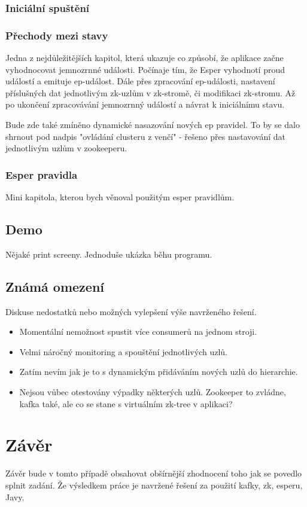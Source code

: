 \documentclass[
  digital, %
  table,   %
  nolof,     %
  nolot,     %
  twoside,
  nocover,
  monochrome,
  12pt
]{fithesis3}
\begin{document}
\subsection{Iniciální spuštění}
\subsection{Přechody mezi stavy}
Jedna z nejdůležitějších kapitol, která ukazuje co způsobí, že aplikace začne vyhodnocovat jemnozrnné události. Počínaje tím, že Esper vyhodnotí proud událostí a emituje ep-událost. Dále přes zpracování ep-události, nastavení příslušných dat jednotlivým zk-uzlům v zk-stromě, či modifikaci zk-stromu. Až po ukončení zpracovávání jemnozrnný událostí a návrat k iniciálnímu stavu.

Bude zde také zmíněno dynamické nasazování nových ep pravidel. To by se dalo shrnout pod nadpis "ovládání clusteru z venčí" - řešeno přes nastavování dat jednotlivým uzlům v zookeeperu.

\subsection{Esper pravidla}
Mini kapitola, kterou bych věnoval použitým esper pravidlům.
\section{Demo}
Nějaké print screeny. Jednoduše ukázka běhu programu.
\section{Známá omezení}
Diskuse nedostatků nebo možných vylepšení výše navrženého řešení. 
\begin{itemize}
	\item Momentální nemožnost spustit více consumerů na jednom stroji.
	\item Velmi náročný monitoring a spouštění jednotlivých uzlů.
	\item Zatím nevím jak je to s dynamickým přidáváním nových uzlů do hierarchie.
	\item Nejsou vůbec otestovány výpadky některých uzlů. Zookeeper to zvládne, kafka také, ale co se stane s virtuálním zk-tree v aplikaci?
\end{itemize}

\chapter{Závěr}
Závěr bude v tomto případě obsahovat obšírnější zhodnocení toho jak se povedlo splnit zadání. Že výsledkem práce je navržené řešení za použití kafky, zk, esperu, Javy.
\end{document}

